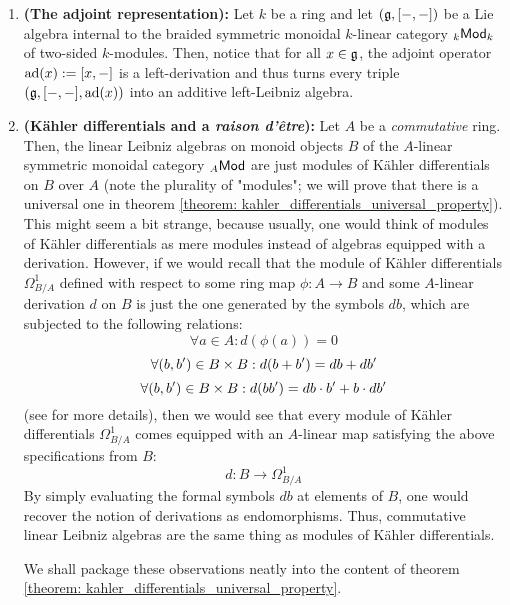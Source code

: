                     \begin{example} \label{example: derivations}
                        \noindent
                        \begin{enumerate}
                            \item \textbf{(The adjoint representation):} Let $k$ be a ring and let $\left(\mathfrak{g}, [-,-]\right)$ be a Lie algebra internal to the braided symmetric monoidal $k$-linear category ${}_k\mathsf{Mod}_k$ of two-sided $k$-modules. Then, notice that for all $x \in \mathfrak{g}$, the adjoint operator $\mathrm{ad}(x) := [x,-]$ is a left-derivation and thus turns every triple $\left(\mathfrak{g}, [-,-], \mathrm{ad}(x)\right)$ into an additive left-Leibniz algebra.
                            \item \textbf{(K\"ahler differentials and a \textit{raison d'\^etre}):} Let $A$ be a \textit{commutative} ring. Then, the linear Leibniz algebras on monoid objects $B$ of the $A$-linear symmetric monoidal category ${}_A\mathsf{Mod}$ are just modules of K\"ahler differentials on $B$ over $A$ (note the plurality of "modules"; we will prove that there is a universal one in theorem \ref{theorem: kahler_differentials_universal_property}). This might seem a bit strange, because usually, one would think of modules of K\"ahler differentials as mere modules instead of algebras equipped with a derivation. However, if we would recall that the module of K\"ahler differentials $\Omega^1_{B/A}$ defined with respect to some ring map $\phi: A \to B$ and some $A$-linear derivation $d$ on $B$ is just the one generated by the symbols $db$, which are subjected to the following relations:
                                $$\forall a \in A: d\left(\phi(a)\right) = 0$$
                                $$\forall (b, b') \in B \x B: d(b + b') = db + db'$$
                                $$\forall (b, b') \in B \x B: d(bb') = db \cdot b' + b \cdot db'$$
                            (see \cite[\href{https://stacks.math.columbia.edu/tag/00RM}{Tag 00RM}]{stacks} for more details), then we would see that every module of K\"ahler differentials $\Omega^1_{B/A}$ comes equipped with an $A$-linear map satisfying the above specifications from $B$:
                                $$d: B \to \Omega^1_{B/A}$$
                            By simply evaluating the formal symbols $db$ at elements of $B$, one would recover the notion of derivations as endomorphisms. Thus, commutative linear Leibniz algebras are the same thing as modules of K\"ahler differentials. 
                            
                            We shall package these observations neatly into the content of theorem \ref{theorem: kahler_differentials_universal_property}. 
                        \end{enumerate}
                    \end{example}
